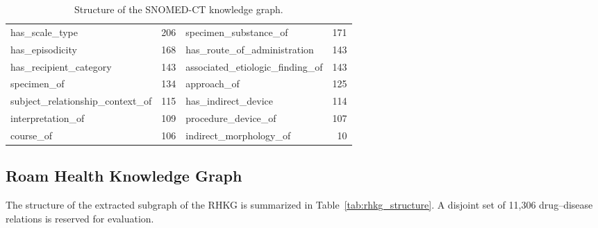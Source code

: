\documentclass[11pt, a4paper]{article}
\begin{document}
\begin{table}[ht]
{\begin{adjustbox}{center}
\begin{tabular}{lr | lr}
has\_scale\_type&206&specimen\_substance\_of&171\\
has\_episodicity&168&has\_route\_of\_administration&143\\
has\_recipient\_category&143&associated\_etiologic\_finding\_of&143\\
specimen\_of&134&approach\_of&125\\
subject\_relationship\_context\_of&115&has\_indirect\_device&114\\
interpretation\_of&109&procedure\_device\_of&107\\
course\_of&106&indirect\_morphology\_of&10\\
        \bottomrule
    \end{tabular}
    \end{adjustbox}
    \caption{Structure of the SNOMED-CT knowledge graph.}
    \label{tab:snomed_structure}
    }
\end{table}

\subsection{Roam Health Knowledge Graph}
The structure of the extracted subgraph of the RHKG is summarized in Table~\ref{tab:rhkg_structure}. A disjoint set of 11,306 drug--disease relations is reserved for evaluation.
\end{document}
